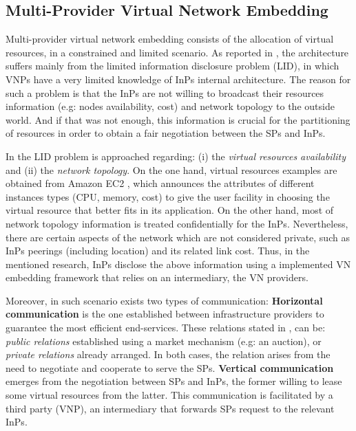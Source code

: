 \subsection{Multi-Provider Virtual Network Embedding}

Multi-provider virtual network embedding consists of the allocation of virtual resources, in a constrained and limited scenario. As reported in \cite{dietrich2015multi}, the architecture suffers mainly from the limited information disclosure problem (LID), in which VNPs have a very limited knowledge of InPs internal architecture. The reason for such a problem is that the InPs are not willing to broadcast their resources information (e.g: nodes availability, cost) and network topology to the outside world. And if that was not enough, this information is crucial for the partitioning of resources in order to obtain a fair negotiation between the SPs and InPs. 

In \cite{dietrich2015multi} the LID problem is approached regarding: (i) the \textit{virtual resources availability} and (ii) the \textit{network topology}. On the one hand, virtual resources examples are obtained from Amazon EC2 \cite{amazonEC2}, which announces the attributes of different instances types (CPU, memory, cost) to give the user facility in choosing the virtual resource that better fits in its application. On the other hand, most of network topology information is treated confidentially for the InPs. Nevertheless, there are certain aspects of the network which are not considered private, such as InPs peerings (including location) and its related link cost. Thus, in the mentioned research, InPs disclose the above information using a implemented VN embedding framework that relies on an intermediary, the VN providers.

Moreover, in such scenario exists two types of communication: \newline
\textbf{Horizontal communication} is the one established between infrastructure providers to guarantee the most efficient end-services. These relations stated in \citep{zaheer2010multi}, can be: \textit{public relations} established using a market mechanism (e.g: an auction), or \textit{private relations} already arranged. In both cases, the relation arises from the need to negotiate and cooperate to serve the SPs. \newline
\textbf{Vertical communication} emerges from the negotiation between SPs and InPs, the former willing to lease some virtual resources from the latter. This communication is facilitated by a third party (VNP), an intermediary that forwards SPs request to the relevant InPs.

